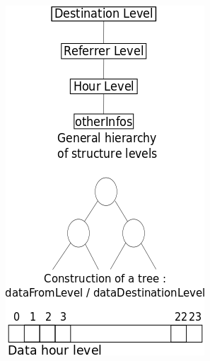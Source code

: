 \documentclass[a4paper, 12pts]{article}
\begin{document}
\begin{figure}[t]
\includegraphics{schemas structures.png}
\end{figure}
\end{document}
